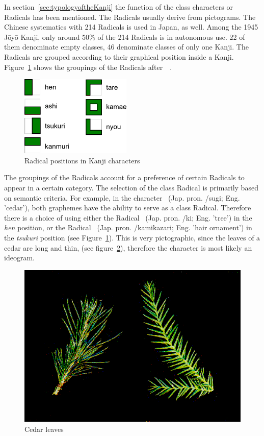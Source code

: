 In section~\ref{sec:typologyoftheKanji} the function of the class characters or
Radicals has been mentioned. The Radicals usually derive from pictograms. The
Chinese systematics with 214 Radicals is used in Japan, as well. Among the 
1945 Jōyō Kanji, only around 50\% of the 214 Radicals is in autonomous use.
22 of them denominate empty classes, 46 denominate classes of only one Kanji.
The Radicals are grouped according to their graphical position inside a Kanji.
Figure~\ref{fig:radicalPositions} shows the groupings of the Radicals 
after~~\citeyear{Foljanty1984}.
\begin{figure}[htbp]
\begin{center}
\includegraphics{images/radicalStructure/radicalPositions.png}
\caption{Radical positions in Kanji characters}
\label{fig:radicalPositions}
\end{center}
\end{figure}
The groupings of the Radicals account for a preference of certain Radicals
to appear in a certain category. The selection of the class Radical is primarily
based on semantic criteria. For example, in the character ~(Jap. pron. 
/sugi; Eng. 'cedar'), both graphemes have the ability to serve as a 
class Radical. Therefore there is a choice of using either the Radical 
~(Jap. pron. /ki; Eng. 'tree') in the \emph{hen} position, 
or the Radical ~(Jap. pron. /kamikazari; 
Eng. 'hair ornament') in the \emph{tsukuri} position (see 
Figure~\ref{fig:radicalPositions}). This is very pictographic, since the leaves
of a cedar are long and thin, (see figure~\ref{fig:cedarleaves}), 
therefore the character is most likely an ideogram.
\begin{figure}[htbp]
\begin{center}
\includegraphics[scale=0.4]{images/radicalStructure/cedar.png}
\caption{Cedar leaves}
\label{fig:cedarleaves}
\end{center}
\end{figure}
